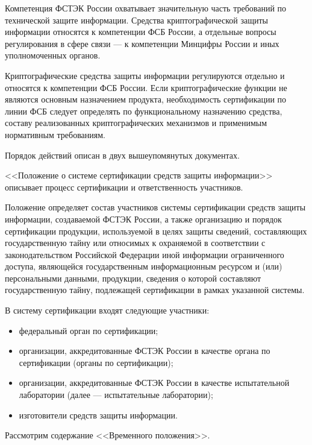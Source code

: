 Компетенция ФСТЭК России охватывает значительную часть требований по технической защите информации. Средства криптографической защиты информации относятся к компетенции ФСБ России, а отдельные вопросы регулирования в сфере связи --- к компетенции Минцифры России и иных уполномоченных органов.

Криптографические средства защиты информации регулируются отдельно и относятся к компетенции ФСБ России. Если криптографические функции не являются основным назначением продукта, необходимость сертификации по линии ФСБ следует определять по функциональному назначению средства, составу реализованных криптографических механизмов и применимым нормативным требованиям.

Порядок действий описан в двух вышеупомянутых документах.

<<Положение о системе сертификации средств защиты информации>> описывает процесс сертификации и ответственность участников.

Положение определяет состав участников системы сертификации средств защиты информации, создаваемой ФСТЭК России, а также организацию и порядок сертификации продукции, используемой в целях защиты сведений, составляющих государственную тайну или относимых к охраняемой в соответствии с законодательством Российской Федерации иной информации ограниченного доступа, являющейся государственным информационным ресурсом и (или) персональными данными, продукции, сведения о которой составляют государственную тайну, подлежащей сертификации в рамках указанной системы.

В систему сертификации входят следующие участники:
\begin{itemize}
    \item федеральный орган по сертификации;
    \item организации, аккредитованные ФСТЭК России в качестве органа по сертификации (органы по сертификации);
    \item организации, аккредитованные ФСТЭК России в качестве испытательной лаборатории (далее --- испытательные лаборатории);
    \item изготовители средств защиты информации.
\end{itemize}
Рассмотрим содержание <<Временного положения>>.

